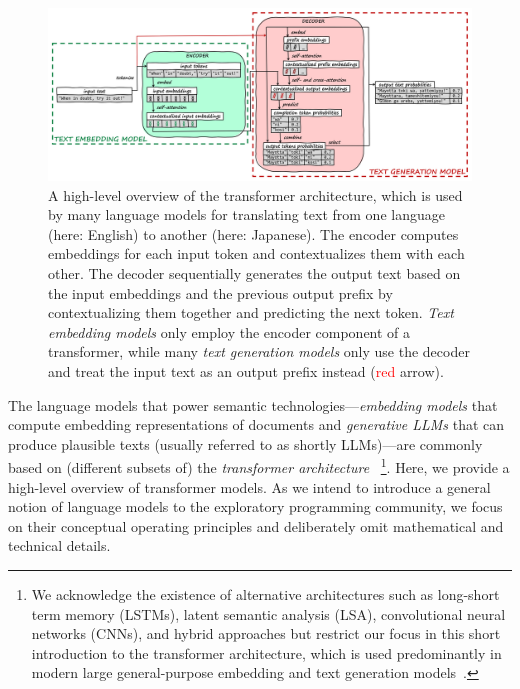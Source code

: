 \begin{figure}[Z]
	\centering
	\includegraphics[width=\linewidth]{04_semtec/transformer.png}
	\caption[A high-level overview of the \emph{transformer architecture} for large language models that embed and generate text.]{
		A high-level overview of the transformer architecture, which is used by many language models for translating text from one language (here: English) to another (here: Japanese).
		The encoder computes embeddings for each input token and contextualizes them with each other.
		The decoder sequentially generates the output text based on the input embeddings and the previous output prefix by contextualizing them together and predicting the next token.
		\emph{Text embedding models} only employ the encoder component of a transformer, while many \emph{text generation models} only use the decoder and treat the input text as an output prefix instead (\textcolor{red}{red} arrow).
	}
	\label{fig:background/semtec/transformer}
\end{figure}

The language models that power semantic technologies---\emph{embedding models} that compute embedding representations of documents and \emph{generative LLMs} that can produce plausible texts (usually referred to as shortly LLMs)---are commonly based on (different subsets of) the \emph{transformer architecture}~\cite{vaswani2017attention}%
\footnote{
	We acknowledge the existence of alternative architectures such as long-short term memory (LSTMs), latent semantic analysis (LSA), convolutional neural networks (CNNs), and hybrid approaches but restrict our focus in this short introduction to the transformer architecture, which is used predominantly in modern large general-purpose embedding and text generation models~\cite{oralkbekova2023contemporary}.
}.
Here, we provide a high-level overview of transformer models.
As we intend to introduce a general notion of language models to the exploratory programming community, we focus on their conceptual operating principles and deliberately omit mathematical and technical details.

